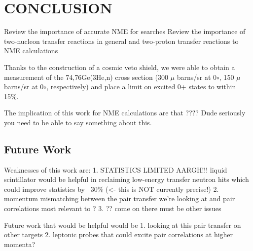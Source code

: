 %
%
%
%
%
%
%
%

%
%

\chapter{CONCLUSION}
\label{chap:conclude}
Review the importance of accurate NME for \zvbb searches
Review the importance of two-nucleon transfer reactions in general and two-proton transfer reactions to NME calculations

Thanks to the construction of a cosmic veto shield, we were able to obtain a measurement of the 74,76Ge(3He,n) cross section (300 $\mu$ barns/sr at 0$\circ$, 150 $\mu$ barns/sr at 0$\circ$, respectively) and place a limit on excited 0+ states to within 15\%.

The implication of this work for NME calculations are that ????  Dude seriously you need to be able to say something about this.

\section{Future Work}
Weaknesses of this work are: 
1. STATISTICS LIMITED AARGH!!!  liquid scintillator would be helpful in reclaiming low-energy transfer neutron hits which could improve statistics by ~30\% (<- this is NOT currently precise!)
2. momentum mismatching between the pair transfer we're looking at and pair correlations most relevant to \zvbb?  
3. ?? come on there must be other issues

Future work that would be helpful would be
1. looking at this pair transfer on other targets
2. leptonic probes that could excite pair correlations at higher momenta? \cite{LeptonPP}


%
% 
% 
